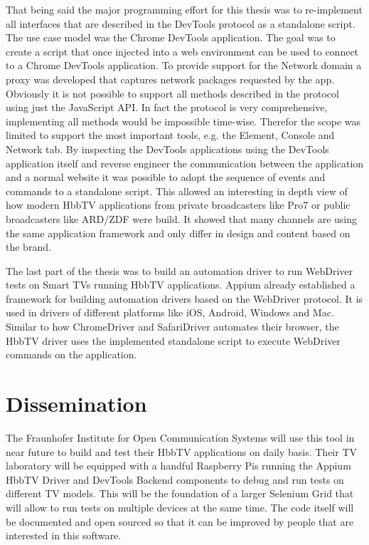 That being said the major programming effort for this thesis was to re-implement all interfaces that are described in the DevTools protocol as a standalone script. The use case model was the Chrome DevTools application. The goal was to create a script that once injected into a web environment can be used to connect to a Chrome DevTools application. To provide support for the Network domain a proxy was developed that captures network packages requested by the app. Obviously it is not possible to support all methods described in the protocol using just the JavaScript API. In fact the protocol is very comprehensive, implementing all methods would be impossible time-wise. Therefor the scope was limited to support the most important tools, e.g. the Element, Console and Network tab. By inspecting the DevTools applications using the DevTools application itself and reverse engineer the communication between the application and a normal website it was possible to adopt the sequence of events and commands to a standalone script. This allowed an interesting in depth view of how modern HbbTV applications from private broadcasters like Pro7 or public broadcasters like ARD/ZDF were build. It showed that many channels are using the same application framework and only differ in design and content based on the brand.

The last part of the thesis was to build an automation driver to run WebDriver tests on Smart TVs running HbbTV applications. Appium already established a framework for building automation drivers based on the WebDriver protocol. It is used in drivers of different platforms like iOS, Android, Windows and Mac. Similar to how ChromeDriver and SafariDriver automates their browser, the HbbTV driver uses the implemented standalone script to execute WebDriver commands on the application.

\section{Dissemination\label{sec:dissemination}}


The Fraunhofer Institute for Open Communication Systems will use this tool in near future to build and test their HbbTV applications on daily basis. Their TV laboratory will be equipped with a handful Raspberry Pis running the Appium HbbTV Driver and DevTools Backend components to debug and run tests on different TV models. This will be the foundation of a larger Selenium Grid that will allow to run tests on multiple devices at the same time. The code itself will be documented and open sourced so that it can be improved by people that are interested in this software.

